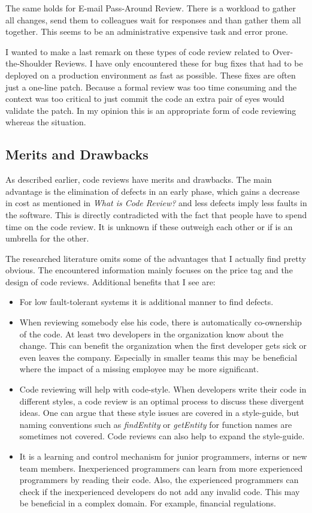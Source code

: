 The same holds for E-mail Pass-Around Review. There is a workload to gather all changes, send them to colleagues wait for responses and than gather them all together.
This seems to be an administrative expensive task and error prone.

I wanted to make a last remark on these types of code review related to Over-the-Shoulder Reviews.
I have only encountered these for bug fixes that had to be deployed on a production environment as fast as possible.
These fixes are often just a one-line patch.
Because a formal review was too time consuming and the context was too critical to just commit the code an extra pair of eyes would validate the patch.
In my opinion this is an appropriate form of code reviewing whereas the situation.

\subsection*{Merits and Drawbacks}

As described earlier, code reviews have merits and drawbacks.
The main advantage is the elimination of defects in an early phase, which gains a decrease in cost as mentioned in \textit{What is Code Review?} and less defects imply less faults in the software.
This is directly contradicted with the fact that people have to spend time on the code review.
It is unknown if these outweigh each other or if is an umbrella for the other.

The researched literature omits some of the advantages that I actually find pretty obvious.
The encountered information mainly focuses on the price tag and the design of code reviews.
Additional benefits that I see are:

\begin{itemize}
\setlength\itemsep{0em}
\item
For low fault-tolerant systems it is additional manner to find defects.
\item
When reviewing somebody else his code, there is automatically co-ownership of the code.
At least two developers in the organization know about the change.
This can benefit the organization when the first developer gets sick or even leaves the company.
Especially in smaller teams this may be beneficial where the impact of a missing employee may be more significant.
\item
Code reviewing will help with code-style. When developers write their code in different styles, a code review is an optimal process to discuss these divergent ideas.
One can argue that these style issues are covered in a style-guide, but naming conventions such as \textit{findEntity} or \textit{getEntity} for function names are sometimes not covered.
Code reviews can also help to expand the style-guide.
\item
It is a learning and control mechanism for junior programmers, interns or new team members.
Inexperienced programmers can learn from more experienced programmers by reading their code.
Also, the experienced programmers can check if the inexperienced developers do not add any invalid code.
This may be beneficial in a complex domain. For example, financial regulations.
\end{itemize}

